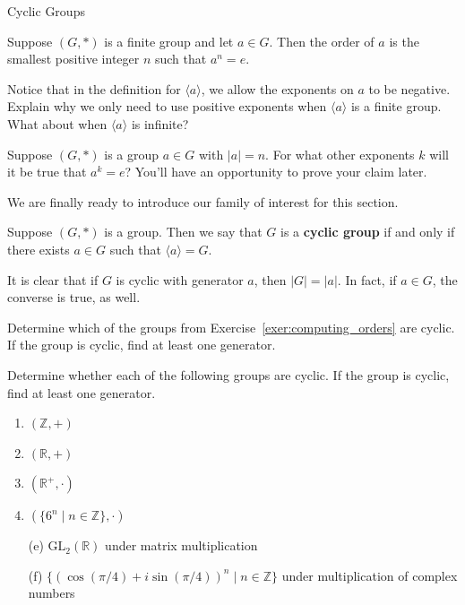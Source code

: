 \begin{section}{Cyclic Groups}
\begin{corollary}
Suppose $(G,*)$ is a finite group and let $a\in G$.  Then the order of $a$ is the smallest positive integer $n$ such that $a^n=e$.
\end{corollary}

\begin{exercise}\label{exer:finite_pos_exps}
Notice that in the definition for $\langle a\rangle$, we allow the exponents on $a$ to be negative.  Explain why we only need to use positive exponents when $\langle a\rangle$ is a finite group.  What about when $\langle a\rangle$ is infinite?
\end{exercise}

\begin{problem}\label{prob:MultiplesOfOrder}
Suppose $(G,*)$ is a group $a\in G$ with $|a|=n$.  For what other exponents $k$ will it be true that $a^k=e$? You'll have an opportunity to prove your claim later.
\end{problem}

We are finally ready to introduce our family of interest for this section.

\begin{definition}
Suppose $(G,*)$ is a group.  Then we say that $G$ is a \textbf{cyclic group} if and only if there exists $a\in G$ such that $\langle a\rangle =G$.
\end{definition}

It is clear that if $G$ is cyclic with generator $a$, then $|G|=|a|$.  In fact, if $a\in G$, the converse is true, as well.

\begin{exercise}
Determine which of the groups from Exercise~\ref{exer:computing_orders} are cyclic.  If the group is cyclic, find at least one generator.
\end{exercise}

\begin{exercise}
Determine whether each of the following groups are cyclic.  If the group is cyclic, find at least one generator.
\begin{multicols}{2}
\begin{enumerate}[label=\rm{(\alph*)}]
\item $(\mathbb{Z},+)$
\item $(\mathbb{R},+)$
\item $(\mathbb{R}^+,\cdot)$
\item $(\{6^n\mid n\in\mathbb{Z}\},\cdot)$
\end{enumerate}
\end{multicols}
\begin{enumerate}
\item[(e)] $\textrm{GL}_2(\mathbb{R})$ under matrix multiplication
\item[(f)] $\{(\cos(\pi/4) +i\sin(\pi/4))^n\mid n\in \mathbb{Z}\}$ under multiplication of complex numbers
\end{enumerate}
\end{exercise}


\end{section}
